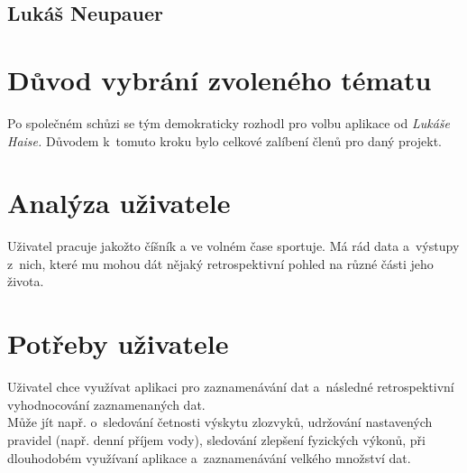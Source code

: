 \documentclass[12pt, titlepage]{article}
\begin{document}
\subsection{Lukáš Neupauer}



\newpage



\section{Důvod vybrání zvoleného tématu}
Po společném schůzi se tým demokraticky rozhodl pro volbu aplikace od \emph{Lukáše Haise.} Důvodem k~tomuto kroku bylo celkové zalíbení členů pro daný projekt.

\section{Analýza uživatele}
Uživatel pracuje jakožto číšník a ve volném čase sportuje. Má rád data a~výstupy z~nich, které mu mohou dát nějaký retrospektivní pohled na různé části jeho života. 

\section{Potřeby uživatele}
Uživatel chce využívat aplikaci pro zaznamenávání dat a~následné retrospektivní vyhodnocování zaznamenaných dat.\\
Může jít např. o~sledování četnosti výskytu zlozvyků, udržování nastavených pravidel (např. denní příjem vody), sledování zlepšení fyzických výkonů,  při dlouhodobém využívaní aplikace a~zaznamenávání velkého množství dat.
\end{document}
